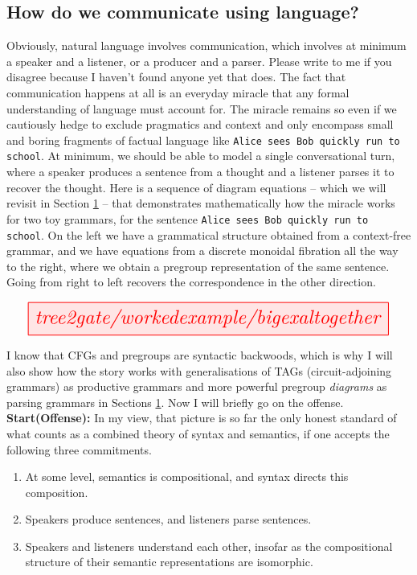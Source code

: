 \begin{fullwidth}

\section{How do we communicate using language?}

 Obviously, natural language involves communication, which involves at minimum a speaker and a listener, or a producer and a parser. Please write to me if you disagree because I haven't found anyone yet that does. The fact that communication happens at all is an everyday miracle that any formal understanding of language must account for. The miracle remains so even if we cautiously hedge to exclude pragmatics and context and only encompass small and boring fragments of factual language like \texttt{Alice sees Bob quickly run to school}. At minimum, we should be able to model a single conversational turn, where a speaker produces a sentence from a thought and a listener parses it to recover the thought. Here is a sequence of diagram equations -- which we will revisit in Section \ref{} -- that demonstrates mathematically how the miracle works for two toy grammars, for the sentence \texttt{Alice sees Bob quickly run to school}. On the left we have a grammatical structure obtained from a context-free grammar, and we have equations from a discrete monoidal fibration all the way to the right, where we obtain a pregroup representation of the same sentence. Going from right to left recovers the correspondence in the other direction.

\[\resizebox{\textwidth}{!}{\tikzfig{tree2gate/workedexample/bigexaltogether}}\]

I know that CFGs and pregroups are syntactic backwoods, which is why I will also show how the story works with generalisations of TAGs (circuit-adjoining grammars) as productive grammars and more powerful pregroup \emph{diagrams} as parsing grammars in Sections \ref{}. Now I will briefly go on the offense. \textbf{\\Start(Offense):} In my view, that picture is so far the only honest standard of what counts as a combined theory of syntax and semantics, if one accepts the following three commitments.

\begin{enumerate}
\item{At some level, semantics is compositional, and syntax directs this composition.}
\item{Speakers produce sentences, and listeners parse sentences.}
\item{Speakers and listeners understand each other, insofar as the compositional structure of their semantic representations are isomorphic.}
\end{enumerate}


\end{fullwidth}
